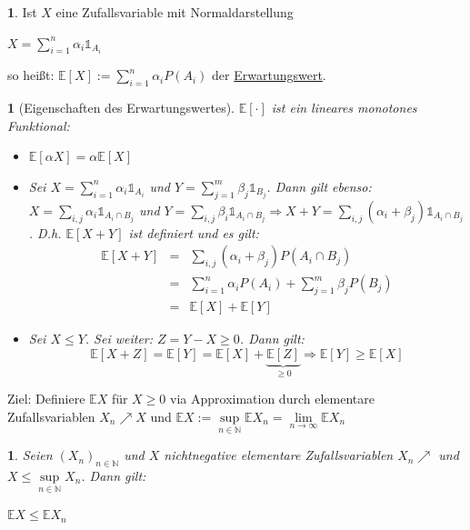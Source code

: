 \documentclass[10pt,a4paper]{report}
\numberwithin{equation}{section}
\numberwithin{figure}{section}
\theoremstyle{plain}
\theoremstyle{definition}
\newtheorem{defn}[thm]{\protect\definitionname}
\theoremstyle{remark}
\theoremstyle{plain}
\newtheorem{lem}[thm]{\protect\lemmaname}
\newtheorem{prop}[thm]{\protect\propositionname}
\providecommand{\definitionname}{Definition}
\providecommand{\lemmaname}{Lemma}
\providecommand{\propositionname}{Satz}
\newcommand{\1}{ \mathbb{1} } %
\begin{document}
\begin{defn}    %
  Ist $X$ eine Zufallsvariable mit Normaldarstellung
  \begin{center}
    $X=\sum\limits_{i=1}^n\alpha_i\1_{A_i}$
  \end{center}
  so heißt: $\mathbb{E}[X]:=\sum\limits_{i=1}^n\alpha_iP(A_i)$ der \underline{Erwartungswert}.
\end{defn}
\begin{prop}[Eigenschaften des Erwartungswertes] 
  $\mathbb{E}[\cdot]$ ist ein lineares monotones Funktional:
  \begin{itemize}
  \item $\mathbb{E}[\alpha X]=\alpha \mathbb{E}[X]$
  \item Sei $X=\sum\limits_{i=1}^n\alpha_i \1_{A_i}$ und
    $Y=\sum\limits_{j=1}^m\beta_j\1_{B_j}$. Dann gilt ebenso:
    $X=\sum\limits_{i,j}\alpha_i\1_{A_i\cap B_j}$ und
    $Y=\sum\limits_{i,j}\beta_i\1_{A_i\cap B_j} \Rightarrow
    X+Y=\sum\limits_{i,j}(\alpha_i+\beta_j)\1_{A_i\cap
      B_j}$. D.h. $\mathbb{E}[X+Y]$ ist definiert und es gilt:
    \begin{eqnarray*}
      \mathbb{E}[X+Y]&=& \sum\limits_{i,j}(\alpha_i+\beta_j)P(A_i\cap B_j)\\
      &=&\sum\limits_{i=1}^n\alpha_i P(A_i)+\sum\limits_{j=1}^m\beta_jP(B_j)\\
      &=&\mathbb{E}[X]+\mathbb{E}[Y]
    \end{eqnarray*} 
  \item Sei $X\leq Y$. Sei weiter: $Z=Y-X\geq 0$. Dann gilt:
    \[\mathbb{E}[X+Z]=\mathbb{E}[Y]=\mathbb{E}[X]+\underbrace{\mathbb{E}[Z]}_{\geq
      0} \Rightarrow \mathbb{E}[Y]\geq \mathbb{E}[X]\]
  \end{itemize}
\end{prop}
Ziel: Definiere $\mathbb{E}X$ für $X\geq 0$ via Approximation durch elementare Zufallsvariablen $X_n\nearrow X$ und $\mathbb{E}X:=\sup\limits_{n\in \mathbb{N}}\mathbb{E}X_n=\lim\limits_{n\to \infty} \mathbb{E}X_n$
\begin{lem}\label{lem:erwartungswertabschaetzung}   %
  Seien $(X_n)_{n\in \mathbb{N}}$ und $X$ nichtnegative elementare Zufallsvariablen
  $X_n\nearrow$ und $X\leq \sup\limits_{n\in \mathbb{N}} X_n$. Dann
  gilt:
  \begin{center}
    $\mathbb{E}X\leq \mathbb{E}X_n$
  \end{center}
\end{lem}
\end{document}
